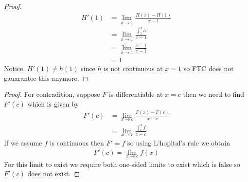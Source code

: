 \begin{proof}
    \begin{align*}
        H'(1) &= \lim_{x\rightarrow 1} \frac{H(x)-H(1)}{x-1} \\
        &= \lim_{x\rightarrow 1} \frac{\int_1^x h}{x-1} \\
        &= \lim_{x\rightarrow 1} \frac{x-1}{x-1} \\
        &= 1
    \end{align*}
    Notice, $H'(1)\neq h(1)$ since $h$ is not continuous at $x=1$ so FTC does not 
    gauarantee this anymore.
\end{proof}

\begin{proof}
    For contradition, suppose $F$ is differentiable at $x=c$ then 
    we need to find $F'(c)$ which is given by 
    \begin{align*}
        F'(c) &= \lim_{x\rightarrow c} \frac{F(x)-F(c)}{x-c} \\
        &= \lim_{x\rightarrow c} \frac{\int_c^x f}{x-c}
    \end{align*}
    If we assume $f$ is continuous then $F' = f$ so using L'hopital's 
    rule we obtain
    \begin{align*}
        F'(c) = \lim_{x\rightarrow c} f(x)
    \end{align*} 
    For this limit to exist we require both one-sided limits to exist which is 
    false so $F'(c)$ does not exist.
\end{proof}

